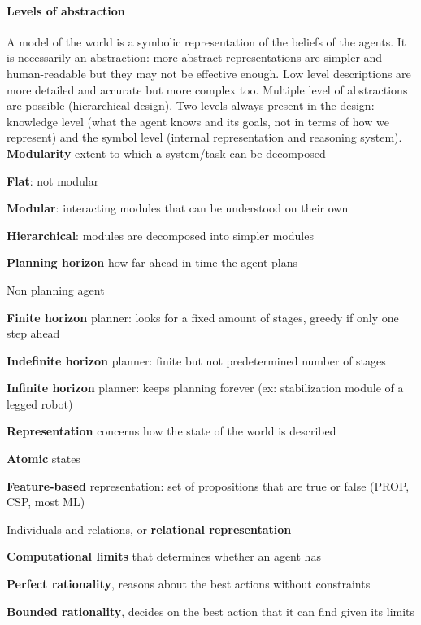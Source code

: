 \documentclass[10pt]{report}
\begin{document}
\paragraph{Levels of abstraction} A model of the world is a symbolic representation of the beliefs of the agents. It is necessarily an abstraction: more abstract representations are simpler and human-readable but they may not be effective enough. Low level descriptions are more detailed and accurate but more complex too. Multiple level of abstractions are possible (hierarchical design). Two levels always present in the design: knowledge level (what the agent knows and its goals, not in terms of how we represent) and the symbol level (internal representation and reasoning system). \textbf{Modularity} extent to which a system/task can be decomposed \begin{list}{}{}
	\item \textbf{Flat}: not modular
	\item \textbf{Modular}: interacting modules that can be understood on their own
	\item \textbf{Hierarchical}: modules are decomposed into simpler modules
\end{list}
\textbf{Planning horizon} how far ahead in time the agent plans \begin{list}{}{}
	\item Non planning agent
	\item \textbf{Finite horizon} planner: looks for a fixed amount of stages, greedy if only one step ahead
	\item \textbf{Indefinite horizon} planner: finite but not predetermined number of stages
	\item \textbf{Infinite horizon} planner: keeps planning forever (ex: stabilization module of a legged robot)
\end{list}
\textbf{Representation} concerns how the state of the world is described \begin{list}{}{}
	\item \textbf{Atomic} states
	\item \textbf{Feature-based} representation: set of propositions that are true or false (PROP, CSP, most ML)
	\item Individuals and relations, or \textbf{relational representation}
\end{list}
\textbf{Computational limits} that determines whether an agent has \begin{list}{}{}
	\item \textbf{Perfect rationality}, reasons about the best actions without constraints
	\item \textbf{Bounded rationality}, decides on the best action that it can find given its limits
\end{list}
\end{document}
